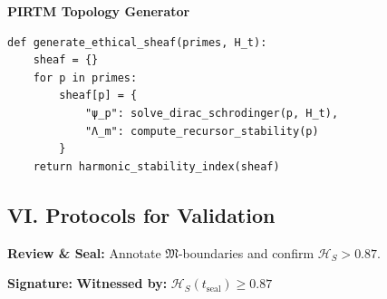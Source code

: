 \documentclass[12pt]{article}
\begin{document}
\textbf{PIRTM Topology Generator}
\begin{verbatim}
def generate_ethical_sheaf(primes, H_t):  
    sheaf = {}  
    for p in primes:  
        sheaf[p] = {  
            "ψ_p": solve_dirac_schrodinger(p, H_t),  
            "Λ_m": compute_recursor_stability(p)  
        }  
    return harmonic_stability_index(sheaf)
\end{verbatim}

\subsection*{VI. Protocols for Validation}

\textbf{Review \& Seal:}  
Annotate $\mathfrak{M}$-boundaries and confirm $\mathcal{H}_S > 0.87$.

\textbf{Signature:} \underline{\hspace{6cm}}  
\textbf{Witnessed by:} $\mathcal{H}_S(t_{\text{seal}}) \geq 0.87$





\nocite{*}


\end{document}
